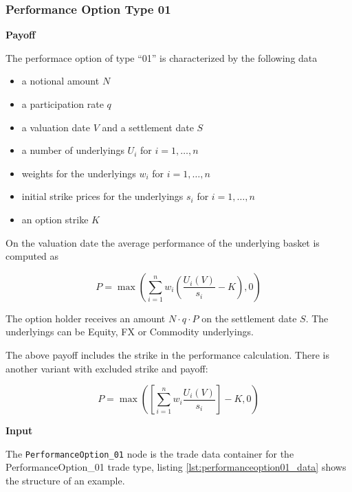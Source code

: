 \subsubsection{Performance Option Type 01}

{\bf Payoff}

The performace option of type ``01'' is characterized by the following data

\begin{itemize}
\item a notional amount $N$
\item a participation rate $q$
\item a valuation date $V$ and a settlement date $S$
\item a number of underlyings $U_i$ for $i=1,\ldots,n$
\item weights for the underlyings $w_i$ for $i=1,\ldots,n$
\item initial strike prices for the underlyings $s_i$ for $i=1,\ldots,n$
\item an option strike $K$
\end{itemize}

On the valuation date the average performance of the underlying basket is computed as

$$
P = \max\left( \sum_{i=1}^n w_i \left( \frac{U_i(V)}{s_i} - K \right), 0 \right)
$$

The option holder receives an amount $N\cdot q\cdot P$ on the settlement date $S$. The underlyings can be Equity, FX or
Commodity underlyings.

The above payoff includes the strike in the performance calculation. There is another variant with excluded strike and payoff:

$$
P = \max\left( \left[ \sum_{i=1}^n w_i \frac{U_i(V)}{s_i} \right] - K, 0 \right)
$$

{\bf Input}

The \verb+PerformanceOption_01+ node is the trade data container for the PerformanceOption\_01 trade type, listing
\ref{lst:performanceoption01_data} shows the structure of an example.

